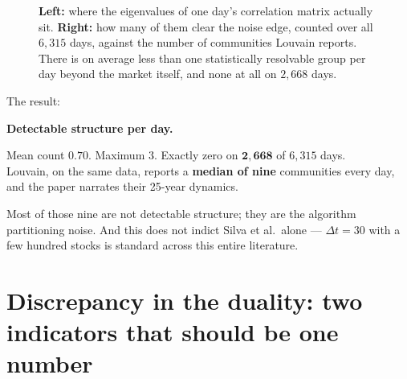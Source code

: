 \documentclass[11pt,a4paper]{article}
\newenvironment{aside}[1]
 {\par\vspace{2.5mm}\begin{lrbox}{\asidebox}%
  \begin{minipage}{\dimexpr\textwidth-16pt\relax}\small\textbf{#1}\par\vspace{1mm}}
 {\end{minipage}\end{lrbox}%
  \noindent\setlength{\fboxsep}{7pt}\setlength{\fboxrule}{.4pt}%
  \fcolorbox{Rule}{Panel2}{\usebox{\asidebox}}\par\vspace{2.5mm}}
\begin{document}
\begin{figure}[t]
\caption{\textbf{Left:} where the eigenvalues of one day's correlation matrix
actually sit. \textbf{Right:} how many of them clear the noise edge, counted
over all $6{,}315$ days, against the number of communities Louvain reports.
There is on average less than one statistically resolvable group per day beyond
the market itself, and none at all on $2{,}668$ days.}
\label{fig:mp}
\end{figure}

\noindent The result:

\begin{aside}{Detectable structure per day.}
Mean count $\mathbf{0.70}$. Maximum $3$. Exactly zero on $\mathbf{2{,}668}$ of
$6{,}315$ days.\\[1mm]
Louvain, on the same data, reports a \textbf{median of nine} communities every
day, and the paper narrates their 25-year dynamics.
\end{aside}

\noindent Most of those nine are not detectable structure; they are the
algorithm partitioning noise. And this does not indict Silva et al.\ alone ---
$\Delta t=30$ with a few hundred stocks is standard across this entire
literature.

\section{Discrepancy in the duality: two indicators that should be one number}
\label{sec:duality}
\end{document}
